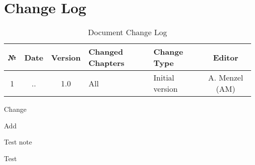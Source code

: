 %
%

\clearpage
\section*{Change Log}

\begin{table}[H]
	\centering
	\begin{tabularx}{\textwidth}{|c|c|c|X|X|c|}
		\hline
		\textbf{№} & \textbf{Date} & \textbf{Version} & \textbf{Changed Chapters} & \textbf{Change Type} & \textbf{Editor}\\
		\hline\hline
		1 & \the\day.\the\month.\the\year & 1.0 & All & Initial version & A. Menzel (AM) \\
		\hline
	\end{tabularx}
	\caption{Document Change Log}
	\label{tab:changelog}
\end{table}


Change 

Add 

Test note

Test 